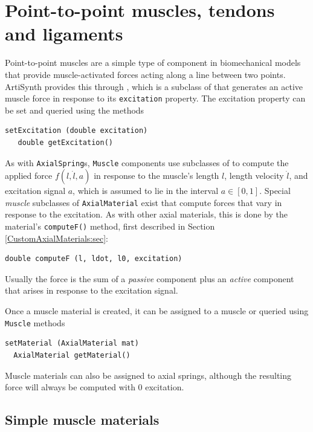 \section{Point-to-point muscles, tendons and ligaments}
\label{PointToPointMuscles:sec}

Point-to-point muscles are a simple type of component in biomechanical
models that provide muscle-activated forces acting along a line
between two points. ArtiSynth provides this through
, which is a subclass of
 that generates an
active muscle force in response to its {\tt excitation} property. The
excitation property can be set and queried using the methods
\begin{lstlisting}[]
   setExcitation (double excitation)
   double getExcitation()
\end{lstlisting}
%

As with {\tt AxialSpring}s, {\tt Muscle} components use subclasses of
 to compute the
applied force $f (l, \dot l, a)$ in response to the muscle's length
$l$, length velocity $\dot l$, and excitation signal $a$, which is
assumed to lie in the interval $a \in [0,1]$. Special {\it muscle}
subclasses of {\tt AxialMaterial} exist that compute forces that vary
in response to the excitation. As with other axial materials, this is
done by the material's {\tt computeF()} method, first described in
Section \ref{CustomAxialMaterials:sec}:
%
\begin{lstlisting}[]
  double computeF (l, ldot, l0, excitation)
\end{lstlisting}
%
Usually the force is the sum of a {\it passive} component plus an {\it
active} component that arises in response to the excitation signal.

Once a muscle material is created, it can be assigned to a muscle
or queried using {\tt Muscle} methods
\begin{lstlisting}[]
  setMaterial (AxialMaterial mat)
  AxialMaterial getMaterial()
\end{lstlisting}
%

\begin{sideblock}
Muscle materials can also be assigned to axial springs, although the
resulting force will always be computed with 0 excitation.
\end{sideblock}

\subsection{Simple muscle materials}
\label{sec:mechii:musclematerials}

